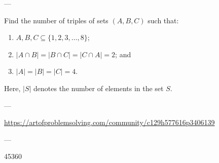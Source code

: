 
---

Find the number of triples of sets $(A,B,C)$ such that:
\begin{enumerate}[label=(\roman*),itemsep=0em]
    \item $A,B,C\subseteq\{1,2,3,\ldots,8\}$;
    \item $|A\cap B|=|B\cap C|=|C\cap A|=2$; and
    \item $|A|=|B|=|C|=4$.
\end{enumerate}
Here, $|S|$ denotes the number of elements in the set $S$.

---

\url{https://artofproblemsolving.com/community/c129h577616p3406139}

---

45360
